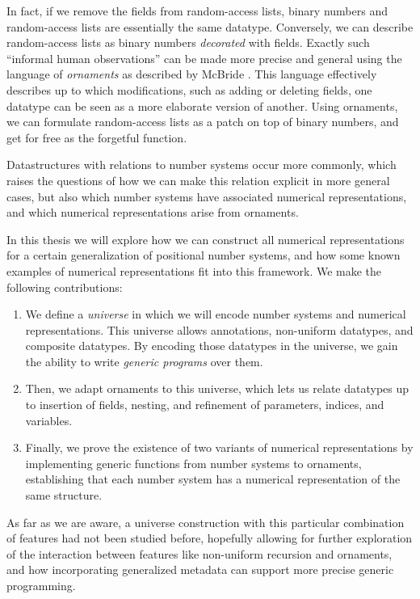 In fact, if we remove the fields from random-access lists, binary numbers and random-access lists are essentially the same datatype. Conversely, we can describe random-access lists as binary numbers \emph{decorated} with fields. Exactly such ``informal human observations'' can be made more precise and general using the language of \emph{ornaments} as described by McBride \cite{algorn}. This language effectively describes up to which modifications, such as adding or deleting fields, one datatype can be seen as a more elaborate version of another. Using ornaments, we can formulate random-access lists as a patch on top of binary numbers, and get  for free as the forgetful function.

Datastructures with relations to number systems occur more commonly, which raises the questions of how we can make this relation explicit in more general cases, but also which number systems have associated numerical representations, and which numerical representations arise from ornaments.
 
In this thesis we will explore how we can construct all numerical representations for a certain generalization of positional number systems, and how some known examples of numerical representations fit into this framework. We make the following contributions:
\begin{enumerate}
    \item We define a \emph{universe} in which we will encode number systems and numerical representations. This universe allows annotations, non-uniform datatypes, and composite datatypes. By encoding those datatypes in the universe, we gain the ability to write \emph{generic programs} over them.
    \item Then, we adapt ornaments to this universe, which lets us relate datatypes up to insertion of fields, nesting, and refinement of parameters, indices, and variables.
    \item Finally, we prove the existence of two variants of numerical representations by implementing generic functions from number systems to ornaments, establishing that each number system has a numerical representation of the same structure.
\end{enumerate}
As far as we are aware, a universe construction with this particular combination of features had not been studied before, hopefully allowing for further exploration of the interaction between features like non-uniform recursion and ornaments, and how incorporating generalized metadata can support more precise generic programming. 

